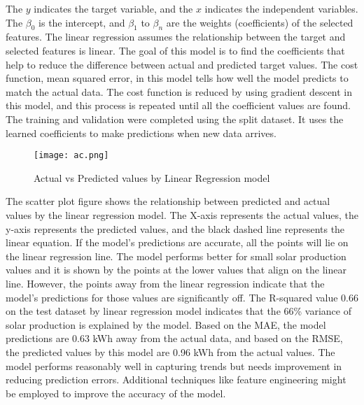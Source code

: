 \documentclass[conference]{IEEEtran}
\begin{document}
	The \(y\) indicates the target variable, and the \(x\) indicates the independent variables. The \(\beta_0\) is the intercept, and \(\beta_1\) to \(\beta_n\) are the weights (coefficients) of the selected features. The linear regression assumes the relationship between the target and selected features is linear. The goal of this model is to find the coefficients that help to reduce the difference between actual and predicted target values. The cost function, mean squared error, in this model tells how well the model predicts to match the actual data. The cost function is reduced by using gradient descent in this model, and this process is repeated until all the coefficient values are found. The training and validation were completed using the split dataset. It uses the learned coefficients to make predictions when new data arrives.
\begin{figure}[H] %
    \centering
    \texttt{[image: ac.png]}
    \caption{Actual vs Predicted values by Linear Regression model}
    \label{fig:Actual vs Predicted values by Linear Regression model}
\end{figure}

The scatter plot figure shows the relationship between predicted and actual values by the linear regression model. The X-axis represents the actual values, the y-axis represents the predicted values, and the black dashed line represents the linear equation. If the model's predictions are accurate, all the points will lie on the linear regression line. The model performs better for small solar production values and it is shown by the points at the lower values that align on the linear line. However, the points away from the linear regression indicate that the model's predictions for those values are significantly off. The R-squared value 0.66 on the test dataset by linear regression model indicates that the 66\% variance of solar production is explained by the model. Based on the MAE, the model predictions are 0.63 kWh away from the actual data, and based on the RMSE, the predicted values by this model are 0.96 kWh from the actual values. The model performs reasonably well in capturing trends but needs improvement in reducing prediction errors. Additional techniques like feature engineering might be employed to improve the accuracy of the model.
\end{document}
